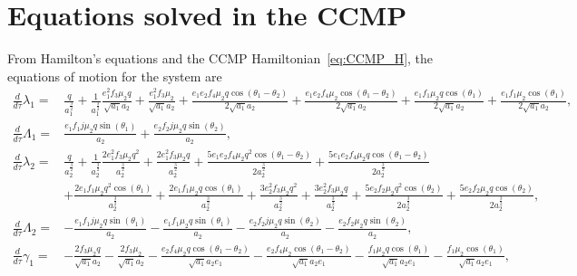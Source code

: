 \documentclass[usenatbib,twocolumn]{mnras}
\begin{document}
\section{Equations solved in the CCMP}\label{sec:eqCCMP}
From Hamilton's equations and the CCMP Hamiltonian~\ref{eq:CCMP_H}, the equations of motion for the system are
\begin{align}
    \frac{d}{d\tau} \lambda_1 =& \frac{q}{a_{1}^{\frac{3}{2}}} + \frac{1}{a_{1}^{\frac{3}{2}}}
    \frac{e_{1}^{2} f_{3} \mu_{2} q}{\sqrt{a_{1}} a_{2}} + \frac{e_{1}^{2} f_{3} \mu_{2}}{\sqrt{a_{1}} a_{2}} + \frac{e_{1} e_{2} f_{4} \mu_{2} q \cos{\left(\theta_{1} - \theta_{2} \right)}}{2 \sqrt{a_{1}} a_{2}} + \frac{e_{1} e_{2} f_{4} \mu_{2} \cos{\left(\theta_{1} - \theta_{2} \right)}}{2 \sqrt{a_{1}} a_{2}} + \frac{e_{1} f_{1} \mu_{2} q \cos{\left(\theta_{1} \right)}}{2 \sqrt{a_{1}} a_{2}} + \frac{e_{1} f_{1} \mu_{2} \cos{\left(\theta_{1} \right)}}{2 \sqrt{a_{1}} a_{2}},\\
    \frac{d}{d\tau} \Lambda_1 =&\frac{e_{1} f_{1} j \mu_{2} q \sin{\left(\theta_{1} \right)}}{a_{2}} + \frac{e_{2} f_{2} j \mu_{2} q \sin{\left(\theta_{2} \right)}}{a_{2}}, \\
    \frac{d}{d\tau} \lambda_2 =& \frac{q}{a_{2}^{\frac{3}{2}}} + \frac{1}{a_{2}^{\frac{3}{2}}}
    \frac{2 e_{1}^{2} f_{3} \mu_{2} q^{2}}{a_{2}^{\frac{3}{2}}} + \frac{2 e_{1}^{2} f_{3} \mu_{2} q}{a_{2}^{\frac{3}{2}}} + \frac{5 e_{1} e_{2} f_{4} \mu_{2} q^{2} \cos{\left(\theta_{1} - \theta_{2} \right)}}{2 a_{2}^{\frac{3}{2}}} + \frac{5 e_{1} e_{2} f_{4} \mu_{2} q \cos{\left(\theta_{1} - \theta_{2} \right)}}{2 a_{2}^{\frac{3}{2}}} \nonumber\\
    &+ \frac{2 e_{1} f_{1} \mu_{2} q^{2} \cos{\left(\theta_{1} \right)}}{a_{2}^{\frac{3}{2}}} + \frac{2 e_{1} f_{1} \mu_{2} q \cos{\left(\theta_{1} \right)}}{a_{2}^{\frac{3}{2}}} + \frac{3 e_{2}^{2} f_{3} \mu_{2} q^{2}}{a_{2}^{\frac{3}{2}}} + \frac{3 e_{2}^{2} f_{3} \mu_{2} q}{a_{2}^{\frac{3}{2}}} + \frac{5 e_{2} f_{2} \mu_{2} q^{2} \cos{\left(\theta_{2} \right)}}{2 a_{2}^{\frac{3}{2}}} + \frac{5 e_{2} f_{2} \mu_{2} q \cos{\left(\theta_{2} \right)}}{2 a_{2}^{\frac{3}{2}}},  \\
    \frac{d}{d\tau} \Lambda_2 =&- \frac{e_{1} f_{1} j \mu_{2} q \sin{\left(\theta_{1} \right)}}{a_{2}} - \frac{e_{1} f_{1} \mu_{2} q \sin{\left(\theta_{1} \right)}}{a_{2}} - \frac{e_{2} f_{2} j \mu_{2} q \sin{\left(\theta_{2} \right)}}{a_{2}} - \frac{e_{2} f_{2} \mu_{2} q \sin{\left(\theta_{2} \right)}}{a_{2}}, \\
    \frac{d}{d\tau} \gamma_1 =&- \frac{2 f_{3} \mu_{2} q}{\sqrt{a_{1}} a_{2}} - \frac{2 f_{3} \mu_{2}}{\sqrt{a_{1}} a_{2}} - \frac{e_{2} f_{4} \mu_{2} q \cos{\left(\theta_{1} - \theta_{2} \right)}}{\sqrt{a_{1}} a_{2} e_{1}} - \frac{e_{2} f_{4} \mu_{2} \cos{\left(\theta_{1} - \theta_{2} \right)}}{\sqrt{a_{1}} a_{2} e_{1}} - \frac{f_{1} \mu_{2} q \cos{\left(\theta_{1} \right)}}{\sqrt{a_{1}} a_{2} e_{1}} - \frac{f_{1} \mu_{2} \cos{\left(\theta_{1} \right)}}{\sqrt{a_{1}} a_{2} e_{1}}, \\

\end{align}
\end{document}
